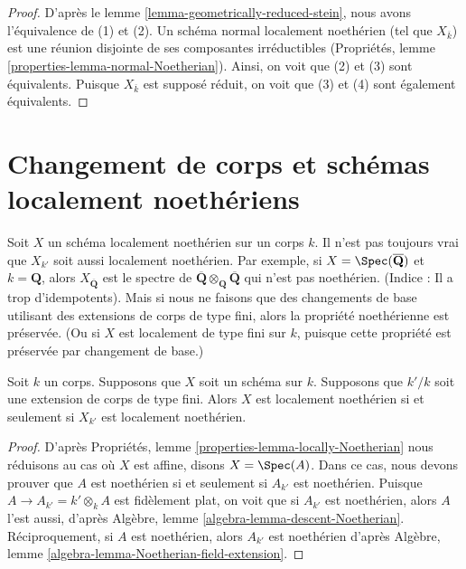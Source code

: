 \begin{proof}
D'après le lemme
\ref{lemma-geometrically-reduced-stein}, nous avons
l'équivalence de (1) et (2). Un schéma normal localement
noethérien (tel que $X_{\overline{k}}$) est une réunion
disjointe de ses composantes irréductibles (Propriétés, lemme
\ref{properties-lemma-normal-Noetherian}). Ainsi, on voit que
(2) et (3) sont équivalents. Puisque $X_{\overline{k}}$ est
supposé réduit, on voit que (3) et (4) sont également équivalents.
\end{proof}









\section{Changement de corps et schémas localement noethériens}
\label{section-locally-Noetherian}

\noindent
Soit $X$ un schéma localement noethérien sur un corps $k$. Il n'est pas
toujours vrai que $X_{k'}$ soit aussi localement noethérien. Par
exemple, si $X = \Spec(\overline{\mathbf{Q}})$ et $k = \mathbf{Q}$,
alors $X_{\overline{\mathbf{Q}}}$ est le spectre de
$\overline{\mathbf{Q}} \otimes_{\mathbf{Q}} \overline{\mathbf{Q}}$ qui n'est
pas noethérien. (Indice : Il a trop d'idempotents). Mais si nous ne faisons
que des changements de base utilisant des extensions de corps de type fini,
alors la propriété noethérienne est préservée. (Ou si $X$ est localement de
type fini sur $k$, puisque cette propriété est préservée par changement de base.)

\begin{lemma}
\label{lemma-locally-Noetherian-base-change}
Soit $k$ un corps. Supposons
que $X$ soit un schéma sur $k$. Supposons que
$k'/k$ soit une extension de corps de type
fini. Alors $X$ est localement noethérien si et
seulement si $X_{k'}$ est localement noethérien.
\end{lemma}

\begin{proof}
D'après Propriétés, lemme
\ref{properties-lemma-locally-Noetherian} nous réduisons au cas où
$X$ est affine, disons $X = \Spec(A)$. Dans ce cas, nous devons
prouver que $A$ est noethérien si et seulement si $A_{k'}$ est
noethérien. Puisque $A \to A_{k'} = k' \otimes_k A$ est fidèlement
plat, on voit que si $A_{k'}$ est noethérien, alors $A$ l'est
aussi, d'après Algèbre, lemme
\ref{algebra-lemma-descent-Noetherian}. Réciproquement, si $A$ est noethérien, alors
$A_{k'}$ est noethérien d'après Algèbre, lemme \ref{algebra-lemma-Noetherian-field-extension}.
\end{proof}







